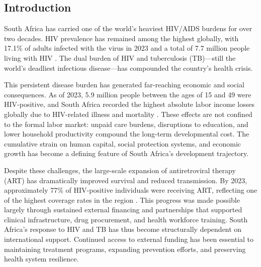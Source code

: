 \documentclass[letterpaper,12pt]{article}
\theoremstyle{definition}
\begin{document}
\begin{spacing}{1.5}


\newpage

\section{Introduction}\label{SecIntro}

South Africa has carried one of the world’s heaviest HIV/AIDS burdens for over two decades. HIV prevalence has remained among the highest globally, with 17.1\% of adults infected with the virus in 2023 and a total of 7.7 million people living with HIV \citep{UNAIDSData2024}. The dual burden of HIV and tuberculosis (TB)—still the world’s deadliest infectious disease—has compounded the country’s health crisis. 

This persistent disease burden has generated far-reaching economic and social consequences. As of 2023, 5.9 million people between the ages of 15 and 49 were HIV-positive, and South Africa recorded the highest absolute labor income losses globally due to HIV-related illness and mortality \citep{ILO2018}. These effects are not confined to the formal labor market: unpaid care burdens, disruptions to education, and lower household productivity compound the long-term developmental cost. The cumulative strain on human capital, social protection systems, and economic growth has become a defining feature of South Africa’s development trajectory.

Despite these challenges, the large-scale expansion of antiretroviral therapy (ART) has dramatically improved survival and reduced transmission. By 2023, approximately 77\% of HIV-positive individuals were receiving ART, reflecting one of the highest coverage rates in the region \citep{UNAIDSData2024}. This progress was made possible largely through sustained external financing and partnerships that supported clinical infrastructure, drug procurement, and health workforce training. South Africa’s response to HIV and TB has thus become structurally dependent on international support. Continued access to external funding has been essential to maintaining treatment programs, expanding prevention efforts, and preserving health system resilience. 


\end{spacing}
\end{document}
